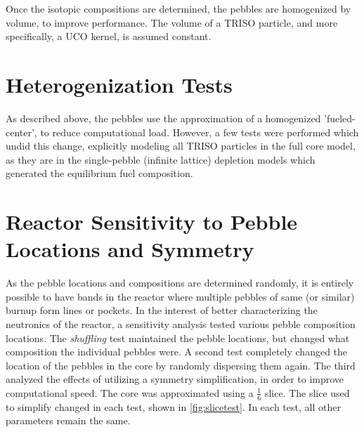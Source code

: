

Once the isotopic compositions are determined, the pebbles are homogenized by volume, to improve performance.  The volume of a TRISO particle, and more specifically, a UCO kernel, is assumed constant.

\section{Heterogenization Tests}

As described above, the pebbles use the approximation of a homogenized 'fueled-center', to reduce computational load.  However, a few tests were performed which undid this change, explicitly modeling all TRISO particles in the full core model, as they are in the single-pebble (infinite lattice) depletion models which generated the equilibrium fuel composition.

\section{Reactor Sensitivity to Pebble Locations and Symmetry}

As the pebble locations and compositions are determined randomly, it is entirely possible to have bands in the reactor where multiple pebbles of same (or similar) burnup form lines or pockets.  In the interest of better characterizing the neutronics of the reactor, a sensitivity analysis tested various pebble composition locations.  The \emph{shuffling} test maintained the pebble locations, but changed what composition the individual pebbles were.  A second test completely changed the location of the pebbles in the core by randomly dispersing them again.  The third analyzed the effects of utilizing a symmetry simplification, in order to improve computational speed.  The core was approximated using a $\frac{1}{6}$ slice.  The slice used to simplify changed in each test, shown in \ref{fig:slicetest}.  In each test, all other parameters remain the same.

